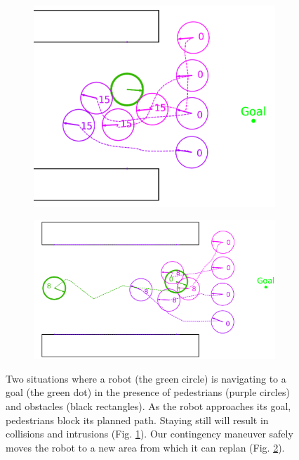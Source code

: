 \documentclass[letterpaper, 10 pt, conference]{ieeeconf}  %
\begin{document}
	\begin{figure}
		\centering
		\begin{subfigure}[t]{0.49\linewidth}
			\includegraphics[width=\linewidth]{dnmotive}
			\caption{}
			\label{fig:dnmotivation}
		\end{subfigure}
		\begin{subfigure}[t]{0.49\linewidth}
			\includegraphics[width=\linewidth]{rlmotive}
			\caption{}
			\label{fig:rlmotivation}
		\end{subfigure}
		\caption{Two situations where a robot (the green circle) is navigating to a goal (the green dot) in the presence of pedestrians (purple circles) and obstacles (black rectangles). As the robot approaches its goal, pedestrians block its planned path. Staying still will result in collisions and intrusions (Fig. \ref{fig:dnmotivation}). Our contingency maneuver safely moves the robot to a new area from which it can replan (Fig. \ref{fig:rlmotivation}).}
		\label{fig:motivation}
	\end{figure}
	
\end{document}
